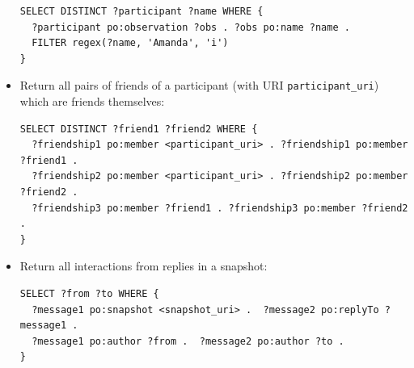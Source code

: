 \documentclass[data,datadescriptor,submit,moreauthors,pdftex]{Definitions/mdpi}
\newcommand{\textttt}[1] {\texttt{\footnotesize#1}}
\begin{document}
\begin{itemize}
\begin{lstlisting}[language=spq]
SELECT DISTINCT ?participant ?name WHERE {
  ?participant po:observation ?obs . ?obs po:name ?name .
  FILTER regex(?name, 'Amanda', 'i') 
}
\end{lstlisting}
  \item Return all pairs of friends of a participant (with URI \textttt{participant\_uri}) which are friends themselves:
\begin{lstlisting}[language=spq]
SELECT DISTINCT ?friend1 ?friend2 WHERE {
  ?friendship1 po:member <participant_uri> . ?friendship1 po:member ?friend1 .
  ?friendship2 po:member <participant_uri> . ?friendship2 po:member ?friend2 .
  ?friendship3 po:member ?friend1 . ?friendship3 po:member ?friend2 .
}
\end{lstlisting}
  \item Return all interactions from replies in a snapshot:
\begin{lstlisting}[language=spq]
SELECT ?from ?to WHERE {
  ?message1 po:snapshot <snapshot_uri> .  ?message2 po:replyTo ?message1 .
  ?message1 po:author ?from .  ?message2 po:author ?to .
}
\end{lstlisting}
\end{itemize}
\end{document}

